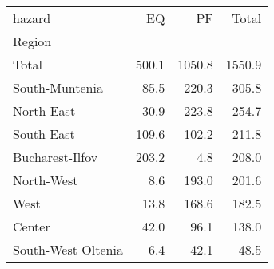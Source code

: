 \begin{tabular}{lrrr}
\toprule
hazard &     EQ &      PF &   Total \\
Region             &        &         &         \\
\midrule
Total              &  500.1 &  1050.8 &  1550.9 \\
South-Muntenia     &   85.5 &   220.3 &   305.8 \\
North-East         &   30.9 &   223.8 &   254.7 \\
South-East         &  109.6 &   102.2 &   211.8 \\
Bucharest-Ilfov    &  203.2 &     4.8 &   208.0 \\
North-West         &    8.6 &   193.0 &   201.6 \\
West               &   13.8 &   168.6 &   182.5 \\
Center             &   42.0 &    96.1 &   138.0 \\
South-West Oltenia &    6.4 &    42.1 &    48.5 \\
\bottomrule
\end{tabular}
